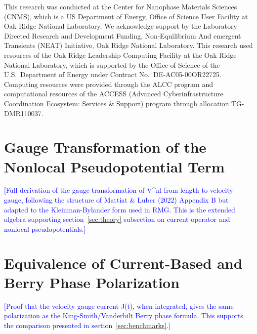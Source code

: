 \documentclass[journal=jctcce,manuscript=article,etalmode=truncate,maxauthors=10,layout=onecolumn]{achemso}
\newcommand{\myblue}[1]{\textcolor{blue}{#1}}
\begin{document}
This research was conducted at the Center for Nanophase Materials
Sciences (CNMS), which is a US Department of Energy, Office of Science
User Facility at Oak Ridge National Laboratory.
We acknowledge support by the Laboratory Directed Research and Development Funding,
Non-Equilibrium And emergent Transients (NEAT) Initiative, Oak Ridge National Laboratory.
This research used resources of the Oak Ridge Leadership Computing
Facility at the Oak Ridge National Laboratory, which is supported by
the Office of Science of the U.S.\ Department of Energy under
Contract No.\ DE-AC05-00OR22725.
Computing resources were provided through the ALCC program
and computational resources of the ACCESS (Advanced Cyberinfrastructure
Coordination Ecosystem: Services \& Support) program through allocation
TG-DMR110037.

\iffalse
\newpage
%



% 
% 
% 
\appendix

\section{Gauge Transformation of the Nonlocal Pseudopotential Term}
\label{app:gauge_nlpp}

\myblue{[Full derivation of the gauge transformation of V\^{}nl from
length to velocity gauge, following the structure of Mattiat \& Luber
(2022) Appendix B but adapted to the Kleinman-Bylander form used in
RMG. This is the extended algebra supporting section~\ref{sec:theory}
subsection on current operator and nonlocal pseudopotentials.]}

\section{Equivalence of Current-Based and Berry Phase Polarization}
\label{app:berry}

\myblue{[Proof that the velocity gauge current J(t), when integrated,
gives the same polarization as the King-Smith/Vanderbilt Berry phase
formula. This supports the comparison presented in
section~\ref{sec:benchmarks}.]}
\end{document}
